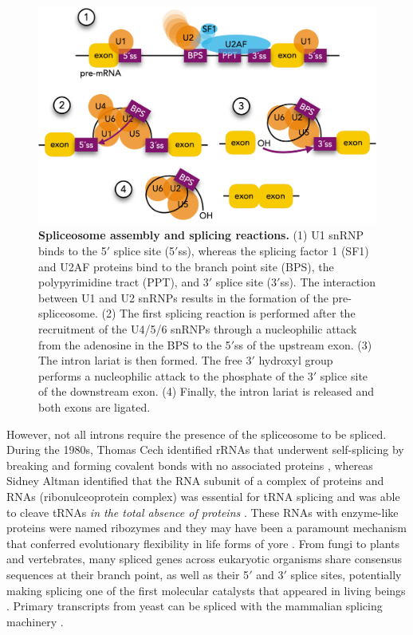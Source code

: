 \begin{figure}[!h]
  \centering
  \includegraphics[width=.5\linewidth]{images/intro/spliceosome-assembly}
  \caption[Spliceosome assembly and splicing reactions]{\textbf{Spliceosome assembly and splicing reactions.} (1) U1 snRNP binds to the 5$'$ splice site (5$'$ss), whereas the splicing factor 1 (SF1) and U2AF proteins bind to the branch point site (BPS), the polypyrimidine tract (PPT), and 3$'$ splice site (3$'$ss). The interaction between U1 and U2 snRNPs results in the formation of the pre-spliceosome. (2) The first splicing reaction is performed after the recruitment of the U4/5/6 snRNPs through a nucleophilic attack from the adenosine in the BPS to the 5$'$ss of the upstream exon. (3) The intron lariat is then formed. The free 3$'$ hydroxyl group performs a nucleophilic attack to the phosphate of the 3$'$ splice site of the downstream exon. (4) Finally, the intron lariat is released and both exons are ligated.}
\end{figure}

However, not all introns require the presence of the spliceosome to be spliced. During the 1980s, Thomas Cech identified rRNAs that underwent self-splicing by breaking and forming covalent bonds with no associated proteins \cite{kruger:1982wk}, whereas Sidney Altman identified that the RNA subunit of a complex of proteins and RNAs (ribonulceoprotein complex) was essential for tRNA splicing and was able to cleave tRNAs \emph{in the total absence of proteins} \cite{altman:1986wp}. These RNAs with enzyme-like proteins were named ribozymes and they may have been a paramount mechanism that conferred evolutionary flexibility in life forms of yore \cite{kruger:1982wk,gilbert:1986td}. From fungi to plants and vertebrates, many spliced genes across eukaryotic organisms share consensus sequences at their branch point, as well as their 5$'$ and 3$'$ splice sites, potentially making splicing one of the first molecular catalysts that appeared in living beings \cite{sharp:1985th}. Primary transcripts from yeast can be spliced with the mammalian splicing machinery \cite{sharp:1985th}.


